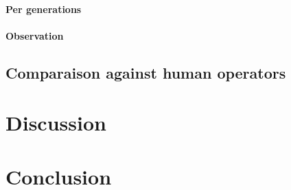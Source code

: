 \documentclass[11pt]{memoir}
\begin{document}
\paragraph{Per generations}

\paragraph{Observation}

\subsection{Comparaison against human operators}

\section{Discussion}

\section{Conclusion}

\nocite{*}


\end{document}
